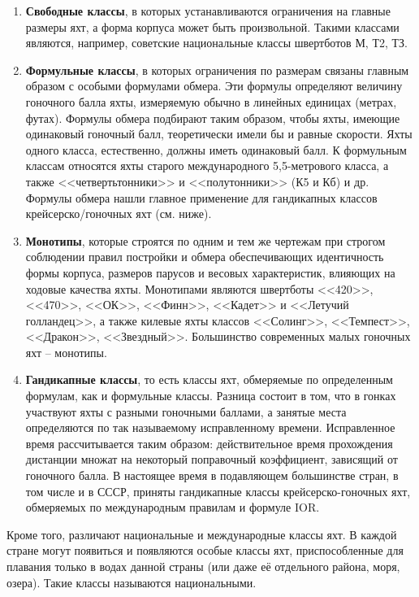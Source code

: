 \documentclass[a4paper, 12pt, twoside, final]{scrbook}
\begin{document}
\begin{enumerate}
\item \textbf{Свободные классы}, в которых устанавливаются ограничения на
главные размеры яхт, а форма корпуса может быть произвольной. Такими
классами являются, например, советские национальные классы швертботов
М, Т2, ТЗ. 
\item \textbf{Формульные классы}, в которых ограничения по размерам связаны
главным образом с особыми формулами обмера. Эти формулы определяют
величину гоночного балла яхты, измеряемую обычно в линейных единицах
(метрах, футах). Формулы обмера подбирают таким образом, чтобы яхты,
имеющие одинаковый гоночный балл, теоретически имели бы и равные скорости.
Яхты одного класса, естественно, должны иметь одинаковый балл. К формульным
классам относятся яхты старого международного 5,5-метрового класса,
а также <<четвертьтонники>> и <<полутонники>> (К5 и Кб) и др. Формулы
обмера нашли главное применение для гандикапных классов крейсерско\-/гоночных
яхт (см. ниже).
\item \textbf{Монотипы}, которые строятся по одним и тем же чертежам при
строгом соблюдении правил постройки и обмера обеспечивающих идентичность
формы корпуса, размеров парусов и весовых характеристик, влияющих
на ходовые качества яхты. Монотипами являются швертботы <<420>>, <<470>>,
<<ОК>>, <<Финн>>, <<Кадет>> и <<Летучий голландец>>, а также килевые яхты
классов <<Солинг>>, <<Темпест>>, <<Дракон>>, <<Звездный>>. Большинство современных
малых гоночных яхт \--- монотипы.
\item \textbf{Гандикапные классы}, то есть классы яхт, обмеряемые по определенным
формулам, как и формульные классы. Разница состоит в том, что в гонках
участвуют яхты с разными гоночными баллами, а занятые места определяются
по так называемому исправленному времени. Исправленное время рассчитывается
таким образом: действительное время прохождения дистанции множат на
некоторый поправочный коэффициент, зависящий от гоночного балла. В
настоящее время в подавляющем большинстве стран, в том числе и в СССР,
приняты гандикапные классы крейсерско-гоночных яхт, обмеряемых по
международным правилам и формуле IOR.
\end{enumerate}
Кроме того, различают национальные и международные классы яхт. В каждой
стране могут появиться и появляются особые классы яхт, приспособленные
для плавания только в водах данной страны (или даже её отдельного
района, моря, озера). Такие классы называются национальными.
\end{document}
